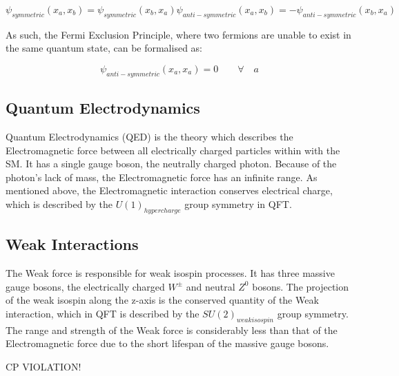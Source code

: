 \begin{equation}
\psi_{symmetric}(x_{a},x_{b}) = \psi_{symmetric}(x_{b},x_{a})
\psi_{anti-symmetric}(x_{a},x_{b}) = -\psi_{anti-symmetric}(x_{b},x_{a})
\end{equation}

As such, the Fermi Exclusion Principle, where two fermions are unable to exist in the same quantum state, can be formalised as\cite{QM}:

\begin{equation}
\psi_{anti-symmetric}(x_{a},x_{a}) = 0 \qquad \forall \quad a
\end{equation}

\subsection{Quantum Electrodynamics}\label{subsec:QED}
Quantum Electrodynamics (QED) is the theory which describes the Electromagnetic force between all electrically charged particles within with the SM. 
It has a single gauge boson, the neutrally charged photon. 
Because of the photon's lack of mass, the Electromagnetic force has an infinite range. 
As mentioned above, the Electromagnetic interaction conserves electrical charge, which is described by the $U(1)_{hypercharge}$ group symmetry in QFT\cite{QFT}. 

\subsection{Weak Interactions}\label{subsec:weakForce}
The Weak force is responsible for weak isospin processes. 
It has three massive gauge bosons, the electrically charged $W^{\pm}$ and neutral $Z^{0}$ bosons. 
The projection of the weak isospin along the z-axis is the conserved quantity of the Weak interaction, which in QFT is described by the $SU(2)_{weak isospin}$ group symmetry. 
The range and strength of the Weak force is considerably less than that of the Electromagnetic force due to the short lifespan of the massive gauge bosons\cite{ElectroweakStrong}. 


CP VIOLATION!	

